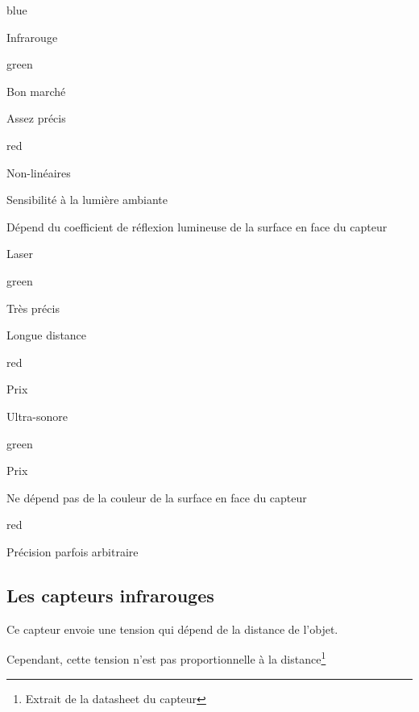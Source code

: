 \begin{items}{blue}{\Triangle}
    \item Infrarouge
    \begin{items}{green}{\Triangle}
        \item Bon marché
        \item Assez précis
    \end{items}
    \begin{items}{red}{\Triangle}
        \item Non-linéaires
        \item Sensibilité à la lumière ambiante
        \item Dépend du coefficient de réflexion lumineuse de la surface en face du capteur
    \end{items}

    \item Laser
    \begin{items}{green}{\Triangle}
        \item Très précis
        \item Longue distance
    \end{items}
    \begin{items}{red}{\Triangle}
        \item Prix
    \end{items}

    \item Ultra-sonore
    \begin{items}{green}{\Triangle}
        \item Prix
        \item Ne dépend pas de la couleur de la surface en face du capteur
    \end{items}
    \begin{items}{red}{\Triangle}
        \item Précision parfois arbitraire
    \end{items}
\end{items}
    

\subsection{Les capteurs infrarouges}

Ce capteur envoie une tension qui dépend de la distance de l'objet.


Cependant, cette tension n'est pas proportionnelle à la distance\footnote{Extrait de la datasheet du capteur}

